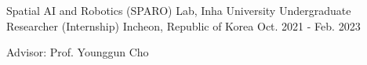 
\begin{cventries}
  \cventry
    {Spatial AI and Robotics (SPARO) Lab, Inha University} %
    {Undergraduate Researcher (Internship)} %
    {Incheon, Republic of Korea} %
    {Oct. 2021 - Feb. 2023} %
    {
      \begin{cvitems}
        \item Advisor: Prof. Younggun Cho
      \end{cvitems}
    }
\end{cventries}
